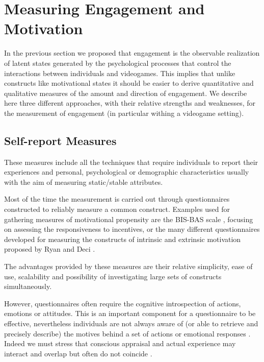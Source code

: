 \section{Measuring Engagement and Motivation}
\label{measuring_motivation_engagement}
In the previous section we proposed that engagement is the observable realization of latent states generated by the psychological processes that control the interactions between individuals and videogames. This implies that unlike constructs like motivational states it should be easier to derive quantitative and qualitative measures of the amount and direction of engagement. We describe here three different approaches, with their relative strengths and weaknesses, for the measurement of engagement (in particular withing a videogame setting).

\subsection{Self-report Measures}
\label{self_report}
These measures include all the techniques that require individuals to report their experiences and personal, psychological or demographic characteristics usually with the aim of measuring static/stable attributes. 

Most of the time the measurement is carried out through questionnaires constructed to reliably measure a common construct. Examples used for gathering measures of motivational propensity are the BIS-BAS scale \cite{carver1994behavioral}, focusing on assessing the responsiveness to incentives, or the many different questionnaires developed for measuring the constructs of intrinsic and extrinsic motivation proposed by Ryan and Deci \cite{ryan2000self}. 

The advantages provided by these measures are their relative simplicity, ease of use, scalability and possibility of investigating large sets of constructs simultaneously. 

However, questionnaires often require the cognitive introspection of actions, emotions or attitudes. This is an important component for a questionnaire to be effective, nevertheless individuals are not always aware of (or able to retrieve and precisely describe) the motives behind a set of actions or emotional responses \cite{avserivskis2017computational}. Indeed we must stress that conscious appraisal and actual experience may interact and overlap but often do not coincide \cite{poeller2018let}. 

